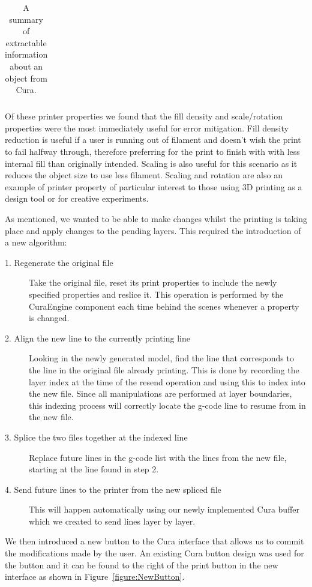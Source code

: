 \documentclass[11pt]{report} %
\begin{document}
\begin{table}[h]
{\begin{minipage}{\textwidth}
\begin{tabular}{| p{3cm} | p{2cm} | p{8.5cm} |}
\end{tabular}
\caption{A summary of extractable information about an object from Cura.}
\label{table:CuraProperties}
\end{minipage} }
\end{table}

	Of these printer properties we found that the fill density and scale/rotation properties were the most immediately useful for error mitigation. Fill density reduction is useful if a user is running out of filament and doesn't wish the print to fail halfway through, therefore preferring for the print to finish with with less internal fill than originally intended. Scaling is also useful for this scenario as it reduces the object size to use less filament. Scaling and rotation are also an example of printer property of particular interest to those using 3D printing as a design tool or for creative experiments. 

	As mentioned, we wanted to be able to make changes whilst the printing is taking place and apply changes to the pending layers. This required the introduction of a new algorithm:

\begin{description}
\item[1. Regenerate the original file] Take the original file, reset its print properties to include the newly specified properties and reslice it. This operation is performed by the CuraEngine component each time behind the scenes whenever a property is changed.
\item[2. Align the new line to the currently printing line] Looking in the newly generated model, find the line that corresponds to the line in the original file already printing. This is done by recording the layer index at the time of the resend operation and using this to index into the new file. Since all manipulations are performed at layer boundaries, this indexing process will correctly locate the g-code line to resume from in the new file.
\item[3. Splice the two files together at the indexed line] Replace future lines in the g-code list with the lines from the new file, starting at the line found in step 2.
\item[4. Send future lines to the printer from the new spliced file] This will happen automatically using our newly implemented Cura buffer which we created to send lines layer by layer.
\end{description}

	We then introduced a new button to the Cura interface that allows us to commit the modifications made by the user. An existing Cura button design was used for the button and it can be found to the right of the print button in the new interface as shown in Figure~\ref{figure:NewButton}.
\end{document}
